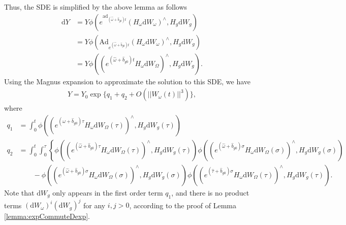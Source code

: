 \documentclass[10pt]{article}
\begin{document}
Thus, the SDE is simplified by the above lemma as follows
\begin{align}
	\mathrm{d}Y &= Y\phi\left(e^{\mathrm{ad}_{(\hat{\omega}+\hat{b}_{g0})t}}(H_\omega\mathrm{d}W_\omega)^\wedge,H_g\mathrm{d}W_g\right) \nonumber \\
	&= Y\phi\left(\mathrm{Ad}_{e^{(\hat{\omega}+\hat{b}_{g0})t}}(H_\omega\mathrm{d}W_\omega)^\wedge,H_g\mathrm{d}W_g\right) \nonumber \\
	&= Y\phi\left(\left(e^{(\hat{\omega}+\hat{b}_{g0})t}H_\omega\mathrm{d}W_\Omega\right)^\wedge,H_g\mathrm{d}W_g\right).
\end{align}
Using the Magnus expansion to approximate the solution to this SDE, we have
\begin{align}
	Y = Y_0\exp\{q_1+q_2+O(||W_\omega(t)||^3)\},
\end{align}
where
\begin{align}
	q_1 &= \int_{0}^{t}\phi\left(\left(e^{(\hat{\omega}+\hat{b}_{g0})\tau}H_\omega\mathrm{d}W_\Omega(\tau)\right)^\wedge,H_g\mathrm{d}W_g(\tau)\right) \\
	q_2 &= \int_{0}^{t}\int_{0}^{\tau}\left\{\phi\left(\left(e^{(\hat{\omega}+\hat{b}_{g0})\tau}H_\omega\mathrm{d}W_\Omega(\tau)\right)^\wedge,H_g\mathrm{d}W_g(\tau)\right)\phi\left(\left(e^{(\hat{\omega}+\hat{b}_{g0})\sigma}H_\omega\mathrm{d}W_\Omega(\sigma)\right)^\wedge,H_g\mathrm{d}W_g(\sigma)\right)\right. \nonumber \\ 
	&\qquad - \phi\left(\left(e^{(\hat{\omega}+\hat{b}_{g0})\sigma}H_\omega\mathrm{d}W_\Omega(\sigma)\right)^\wedge,H_g\mathrm{d}W_g(\sigma)\right)\phi\left(\left(e^{(\hat{\tau}+\hat{b}_{g0})\sigma}H_\omega\mathrm{d}W_\Omega(\tau)\right)^\wedge,H_g\mathrm{d}W_g(\tau)\right).
\end{align}
Note that $\mathrm{d}W_g$ only appears in the first order term $q_1$, and there is no product terms $(\mathrm{d}W_\omega)^i(\mathrm{d}W_g)^j$ for any $i,j>0$, according to the proof of Lemma \ref{lemma:expCommuteDexp}.
\end{document}
